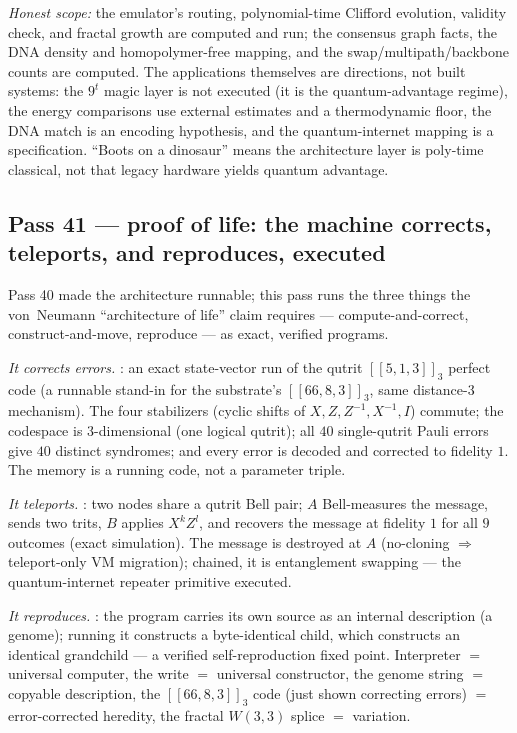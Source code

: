 \documentclass[11pt]{article}
\begin{document}
\emph{Honest scope:} the emulator's routing, polynomial-time Clifford evolution, validity check, and
fractal growth are computed and run; the consensus graph facts, the DNA density and homopolymer-free
mapping, and the swap/multipath/backbone counts are computed. The applications themselves are
directions, not built systems: the $9^t$ magic layer is not executed (it is the quantum-advantage
regime), the energy comparisons use external estimates and a thermodynamic floor, the DNA match is an
encoding hypothesis, and the quantum-internet mapping is a specification. ``Boots on a dinosaur'' means
the architecture layer is poly-time classical, not that legacy hardware yields quantum advantage.

\subsection{Pass 41 --- proof of life: the machine corrects, teleports, and reproduces, executed}
\label{sec:capstone-fortyone}

Pass 40 made the architecture runnable; this pass runs the three things the von~Neumann
``architecture of life'' claim requires --- compute-and-correct, construct-and-move, reproduce ---
as exact, verified programs.

\emph{It corrects errors.} : an exact state-vector run of the qutrit
$[[5,1,3]]_3$ perfect code (a runnable stand-in for the substrate's $[[66,8,3]]_3$, same distance-$3$
mechanism). The four stabilizers (cyclic shifts of $X,Z,Z^{-1},X^{-1},I$) commute; the codespace is
$3$-dimensional (one logical qutrit); all $40$ single-qutrit Pauli errors give $40$ distinct syndromes;
and every error is decoded and corrected to fidelity $1$. The memory is a running code, not a parameter
triple.

\emph{It teleports.} : two nodes share a qutrit Bell pair; $A$
Bell-measures the message, sends two trits, $B$ applies $X^kZ^l$, and recovers the message at fidelity
$1$ for all $9$ outcomes (exact simulation). The message is destroyed at $A$ (no-cloning $\Rightarrow$
teleport-only VM migration); chained, it is entanglement swapping --- the quantum-internet repeater
primitive executed.

\emph{It reproduces.} : the program carries its own source as an
internal description (a genome); running it constructs a byte-identical child, which constructs an
identical grandchild --- a verified self-reproduction fixed point. Interpreter $=$ universal computer,
the write $=$ universal constructor, the genome string $=$ copyable description, the $[[66,8,3]]_3$ code
(just shown correcting errors) $=$ error-corrected heredity, the fractal $W(3,3)$ splice $=$ variation.
\end{document}
